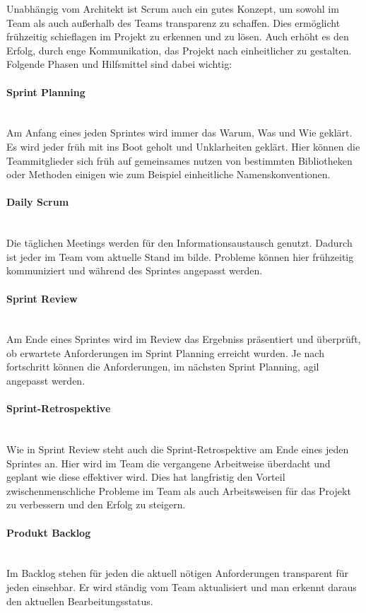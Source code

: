 \documentclass[a4paper, ngerman, 12pt, usenames, dvipsnames]{article}
\begin{document}
Unabhängig vom Architekt ist Scrum auch ein gutes Konzept, um sowohl im Team als auch außerhalb des Teams transparenz zu schaffen. 
Dies ermöglicht frühzeitig schieflagen im Projekt zu erkennen und zu lösen. Auch erhöht es den Erfolg, durch enge Kommunikation, das Projekt nach einheitlicher zu gestalten.
Folgende Phasen und Hilfsmittel sind dabei wichtig:

    \paragraph{Sprint Planning}\mbox{} \\
    Am Anfang eines jeden Sprintes wird immer das Warum, Was und Wie geklärt. 
    Es wird jeder früh mit ins Boot geholt und Unklarheiten geklärt.
    Hier können die Teammitglieder sich früh auf gemeinsames nutzen von bestimmten Bibliotheken oder Methoden einigen wie zum Beispiel einheitliche Namenskonventionen.
    \paragraph{Daily Scrum}\mbox{} \\
    Die täglichen Meetings werden für den Informationsaustausch genutzt. 
    Dadurch ist jeder im Team vom aktuelle Stand im bilde. Probleme können hier frühzeitig kommuniziert und während des Sprintes angepasst werden.
    \paragraph{Sprint Review}\mbox{} \\
    Am Ende eines Sprintes wird im Review das Ergebniss präsentiert und überprüft, ob erwartete Anforderungen im Sprint Planning erreicht wurden.
     Je nach fortschritt können die Anforderungen, im nächsten Sprint Planning, agil angepasst werden.
    \paragraph{Sprint-Retrospektive}\mbox{} \\
    Wie in Sprint Review steht auch die Sprint-Retrospektive am Ende eines jeden Sprintes an. Hier wird im Team die vergangene Arbeitweise überdacht und geplant wie diese effektiver wird.
    Dies hat langfristig den Vorteil zwischenmenschliche Probleme im Team als auch Arbeitsweisen für das Projekt zu verbessern und den Erfolg zu steigern.
    \paragraph{Produkt Backlog}\mbox{} \\
    Im Backlog stehen für jeden die aktuell nötigen Anforderungen transparent für jeden einsehbar. 
    Er wird ständig vom Team aktualisiert und man erkennt daraus den aktuellen Bearbeitungsstatus.
\end{document}
